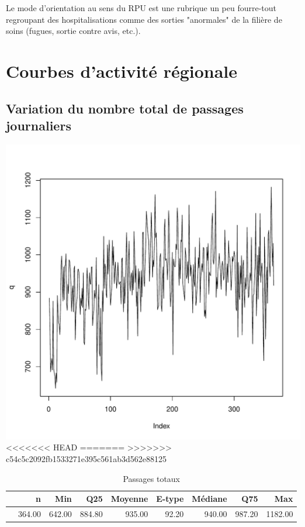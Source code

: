 \documentclass[12pt,english,french,twoside]{book}\usepackage[]{graphicx}\usepackage[]{color}
\makeatletter
\def\maxwidth{ %
  \ifdim\Gin@nat@width>\linewidth
    \linewidth
  \else
    \Gin@nat@width
  \fi
}
\makeatother
\begin{document}

Le mode d'orientation au sens du RPU est une rubrique un peu fourre-tout regroupant des hospitalisations comme des sorties "anormales" de la filière de soins (fugues, sortie contre avis, etc.).


\newpage
\chapter{Courbes d'activité régionale}

 

\section{Variation du nombre total de passages journaliers}


\includegraphics[width=\maxwidth]{figure/passages_totaux1} 
<<<<<<< HEAD
=======
>>>>>>> c54c5c2092fb1533271e395c561ab3d562e88125
\begin{table}[ht]
\centering
\begin{tabular}{rrrrrrrrr}
  \hline
 & n & Min & Q25 & Moyenne & E-type & Médiane & Q75 & Max \\ 
  \hline
 & 364.00 & 642.00 & 884.80 & 935.00 & 92.20 & 940.00 & 987.20 & 1182.00 \\ 
   \hline
\end{tabular}
\caption[Passages totaux]{Passages totaux} 
\label{tab:pt}
\end{table}
\end{document}
